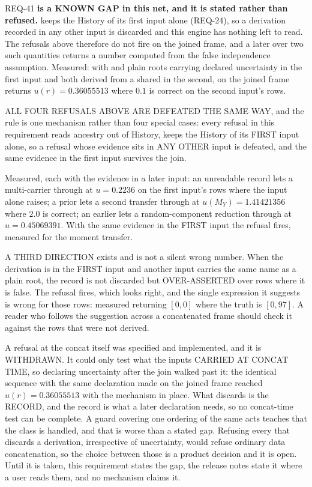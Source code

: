 \begin{reqbox}{REQ-41}{\stable}
\textbf{ is a KNOWN GAP in this net, and it is stated
rather than refused.}  keeps the History of its first input
alone (REQ-24), so a derivation recorded in any other input is
discarded and this engine has nothing left to read. The refusals above
therefore do not fire on the joined frame, and a later
 over two such quantities returns a number computed from
the false independence assumption. Measured: with  and 
plain roots carrying declared uncertainty in the first input and both
derived from a shared  in the second,
 on the joined frame returns
$u(r) = 0.36055513$ where $0.1$ is correct on the second input's rows.

ALL FOUR REFUSALS ABOVE ARE DEFEATED THE SAME WAY, and the rule is one
mechanism rather than four special cases: every refusal in this
requirement reads ancestry out of History,  keeps the
History of its FIRST input alone, so a refusal whose evidence sits in
ANY OTHER input is defeated, and the same evidence in the first input
survives the join.

Measured, each with the evidence in a later input: an unreadable record
lets a multi-carrier  through at $u = 0.2236$ on the first
input's rows where the input alone raises; a prior
 lets a second transfer through at
$u(M_Y) = 1.41421356$ where $2.0$ is correct; an earlier
 lets a random-component reduction through at
$u = 0.45069391$. With the same evidence in the FIRST input the refusal
fires, measured for the moment transfer.

A THIRD DIRECTION exists and is not a silent wrong number. When the
derivation is in the FIRST input and another input carries the same name
as a plain root, the record is not discarded but OVER-ASSERTED over rows
where it is false. The refusal fires, which looks right, and the single
expression it suggests is wrong for those rows: measured
 returning $[0, 0]$ where the truth is $[0, 97]$.
A reader who follows the suggestion across a concatenated frame should
check it against the rows that were not derived.

A refusal at the concat itself was specified and implemented, and it is
WITHDRAWN. It could only test what the inputs CARRIED AT CONCAT TIME, so
declaring uncertainty after the join walked past it: the identical
sequence with the same declaration made on the joined frame reached
$u(r) = 0.36055513$ with the mechanism in place. What 
discards is the RECORD, and the record is what a later declaration
needs, so no concat-time test can be complete. A guard covering one
ordering of the same acts teaches that the class is handled, and that is
worse than a stated gap. Refusing every  that discards a
derivation, irrespective of uncertainty, would refuse ordinary data
concatenation, so the choice between those is a product decision and it
is open. Until it is taken, this requirement states the gap, the release
notes state it where a user reads them, and no mechanism claims it.


\end{reqbox}
